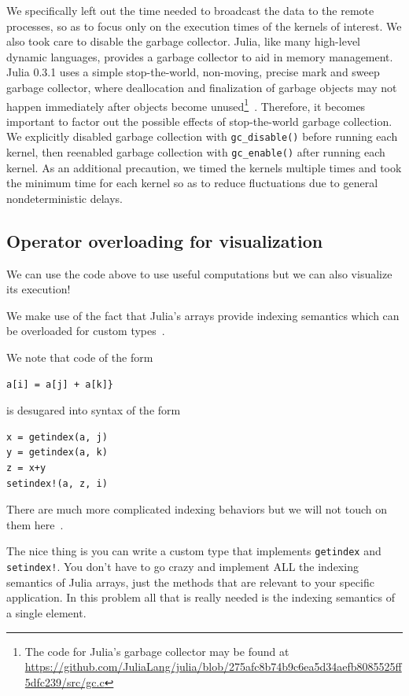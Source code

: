 \documentclass{sig-alternate}
\newcommand{\code}[1]{\texttt{#1}}
\begin{document}
We specifically left out the time needed to broadcast the data to the remote processes, so as to focus only on the execution times of the kernels of interest. We also took care to disable the garbage collector. Julia, like many high-level dynamic languages, provides a garbage collector to aid in memory management. Julia 0.3.1 uses a simple stop-the-world, non-moving, precise mark and sweep garbage collector, where deallocation and finalization of garbage objects may not happen immediately after objects become unused\footnote{The code for Julia's garbage collector may be found at \url{https://github.com/JuliaLang/julia/blob/275afc8b74b9c6ea5d34aefb8085525ff5dfc239/src/gc.c}}~\cite{McCarthy1960}. Therefore, it becomes important to factor out the possible effects of stop-the-world garbage collection. We explicitly disabled garbage collection with \code{gc\_disable()} before running each kernel, then reenabled garbage collection with \code{gc\_enable()} after running each kernel. As an additional precaution, we timed the kernels multiple times and took the minimum time for each kernel so as to reduce fluctuations due to general nondeterministic delays.

\subsection{Operator overloading for visualization}

We can use the code above to use useful computations but we can also visualize its execution!

We make use of the fact that Julia's arrays provide indexing semantics which can be overloaded for custom types~\cite{Bezanson2014}.

We note that code of the form

\begin{verbatim}
a[i] = a[j] + a[k]}
\end{verbatim}
is desugared into syntax of the form

\begin{verbatim}
x = getindex(a, j)
y = getindex(a, k)
z = x+y
setindex!(a, z, i)
\end{verbatim}

There are much more complicated indexing behaviors but we will not touch on them here~\cite{Bezanson2014}.

The nice thing is you can write a custom type that implements \code{getindex} and \code{setindex!}. You don't have to go crazy and implement ALL the indexing semantics of Julia arrays, just the methods that are relevant to your specific application. In this problem all that is really needed is the indexing semantics of a single element.
\end{document}
